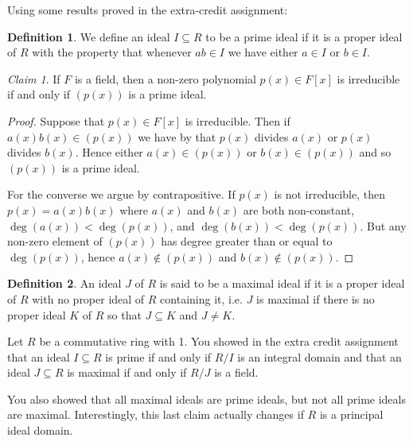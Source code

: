 \documentclass[12pt,letterpaper,DIV=11,final]{scrartcl}
\theoremstyle{plain}
\theoremstyle{definition}
\newtheorem{definition}{Definition}[section]
\theoremstyle{remark}
\newtheorem{claim}{Claim}
\begin{document}
Using some results proved in the extra-credit assignment:

\begin{definition}
  We define an ideal $I \subseteq R$ to be a prime ideal if it is a proper ideal of $R$ with the property that whenever $ab \in I$ we have either $a \in I$ or $b \in I$.
\end{definition}

\begin{claim}
  If $F$ is a field, then a non-zero polynomial $p(x) \in F[x]$ is irreducible if and only if $\left( p(x) \right)$ is a prime ideal.

  \begin{proof}
    Suppose that $p(x) \in F[x]$ is irreducible.
    Then if $a(x) b(x) \in \left( p(x) \right)$ we have by  that $p(x)$ divides $a(x)$ or $p(x)$ divides $b(x)$.
    Hence either $a(x) \in \left( p(x) \right)$ or $b(x) \in \left( p(x) \right)$ and so $\left( p(x) \right)$ is a prime ideal.

    For the converse we argue by contrapositive.
    If $p(x)$ is not irreducible, then $p(x) = a(x) b(x)$ where $a(x)$ and $b(x)$ are both non-constant, $\deg(a(x)) < \deg(p(x))$, and $\deg(b(x)) < \deg(p(x))$.
    But any non-zero element of $\left( p(x) \right)$ has degree greater than or equal to $\deg(p(x))$, hence $a(x) \not\in \left( p(x) \right)$ and $b(x) \not\in \left( p(x) \right)$.
  \end{proof}
\end{claim}

\begin{definition}
  An ideal $J$ of $R$ is said to be a maximal ideal if it is a proper ideal of $R$ with no proper ideal of $R$ containing it, i.e. $J$ is maximal if there is no proper ideal $K$ of $R$ so that $J \subseteq K$ and $J \neq K$.
\end{definition}

Let $R$ be a commutative ring with 1.
You showed in the extra credit assignment that an ideal $I \subseteq R$ is prime if and only if $R/I$ is an integral domain and that an ideal $J \subseteq R$ is maximal if and only if $R/J$ is a field.

You also showed that all maximal ideals are prime ideals, but not all prime ideals are maximal.
Interestingly, this last claim actually changes if $R$ is a principal ideal domain.
\end{document}

